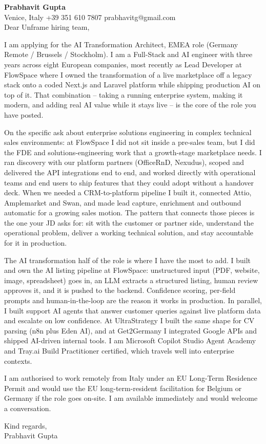 \documentclass[a4paper,10.5pt]{article}
\begin{document}
\textbf{Prabhavit Gupta}\\
Venice, Italy \textbar{} +39 351 610 7807 \textbar{} prabhavitg@gmail.com\\[10pt]
Dear Unframe hiring team,

I am applying for the AI Transformation Architect, EMEA role (Germany Remote / Brussels / Stockholm). I am a Full-Stack and AI engineer with three years across eight European companies, most recently as Lead Developer at FlowSpace where I owned the transformation of a live marketplace off a legacy stack onto a coded Next.js and Laravel platform while shipping production AI on top of it. That combination -- taking a running enterprise system, making it modern, and adding real AI value while it stays live -- is the core of the role you have posted.

On the specific ask about enterprise solutions engineering in complex technical sales environments: at FlowSpace I did not sit inside a pre-sales team, but I did the FDE and solutions-engineering work that a growth-stage marketplace needs. I ran discovery with our platform partners (OfficeRnD, Nexudus), scoped and delivered the API integrations end to end, and worked directly with operational teams and end users to ship features that they could adopt without a handover deck. When we needed a CRM-to-platform pipeline I built it, connected Attio, Amplemarket and Swan, and made lead capture, enrichment and outbound automatic for a growing sales motion. The pattern that connects those pieces is the one your JD asks for: sit with the customer or partner side, understand the operational problem, deliver a working technical solution, and stay accountable for it in production.

The AI transformation half of the role is where I have the most to add. I built and own the AI listing pipeline at FlowSpace: unstructured input (PDF, website, image, spreadsheet) goes in, an LLM extracts a structured listing, human review approves it, and it is pushed to the backend. Confidence scoring, per-field prompts and human-in-the-loop are the reason it works in production. In parallel, I built support AI agents that answer customer queries against live platform data and escalate on low confidence. At UltraStrategy I built the same shape for CV parsing (n8n plus Eden AI), and at Get2Germany I integrated Google APIs and shipped AI-driven internal tools. I am Microsoft Copilot Studio Agent Academy and Tray.ai Build Practitioner certified, which travels well into enterprise contexts.

I am authorised to work remotely from Italy under an EU Long-Term Residence Permit and would use the EU long-term-resident facilitation for Belgium or Germany if the role goes on-site. I am available immediately and would welcome a conversation.

Kind regards,\\
Prabhavit Gupta
\end{document}
